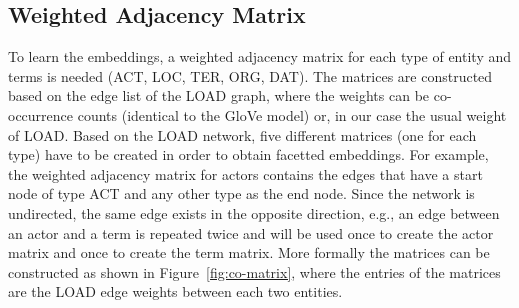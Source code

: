 \subsection{Weighted Adjacency Matrix}\label{sec:adj_matrix}
To learn the embeddings, a weighted adjacency matrix for each type of entity and terms is needed (ACT, LOC, TER, ORG, DAT). The matrices are constructed based on the edge list of the LOAD graph, where the weights can be co-occurrence counts (identical to the GloVe model) or, in our case the usual weight of LOAD. 
Based on the LOAD network, five different matrices (one for each type) have to be created in order to obtain facetted embeddings. For example, the weighted adjacency matrix for actors contains the edges that have a start node of type ACT and any other type as the end node. Since the network is undirected, the same edge exists in the opposite direction, e.g., an edge between an actor and a term is repeated twice and will be used once to create the actor matrix and once to create the term matrix. More formally the matrices can be constructed as shown in Figure~\ref{fig:co-matrix}, where the entries of the matrices are the LOAD edge weights between each two entities.  
